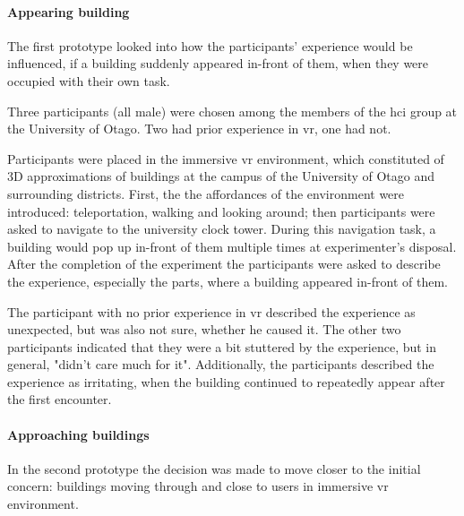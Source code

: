 \paragraph{Appearing building} 
\label{par:appearing_building}
The first prototype looked into how the participants' experience would be influenced, if a building suddenly appeared in-front of them, when they were occupied with their own task.

Three participants (all male) were chosen among the members of the \gls{hci} group at the University of Otago. Two had prior experience in \gls{vr}, one had not.

Participants were placed in the immersive \gls{vr} environment, which constituted of 3D approximations of buildings at the campus of the University of Otago and surrounding districts. First, the the affordances of the environment were introduced: teleportation, walking and looking around; then participants were asked to navigate to the university clock tower. During this navigation task, a building would pop up in-front of them multiple times at experimenter's disposal. After the completion of the experiment the participants were asked to describe the experience, especially the parts, where a building appeared in-front of them.


The participant with no prior experience in \gls{vr} described the experience as unexpected, but was also not sure, whether he caused it. The other two participants indicated that they were a bit stuttered by the experience, but in general, "didn't care much for it". Additionally, the participants described the experience as irritating, when the building continued to repeatedly appear after the first encounter.

\paragraph{Approaching buildings}
\label{par:approaching_building}
In the second prototype the decision was made to move closer to the initial concern: buildings moving through and close to users in immersive \gls{vr} environment.

